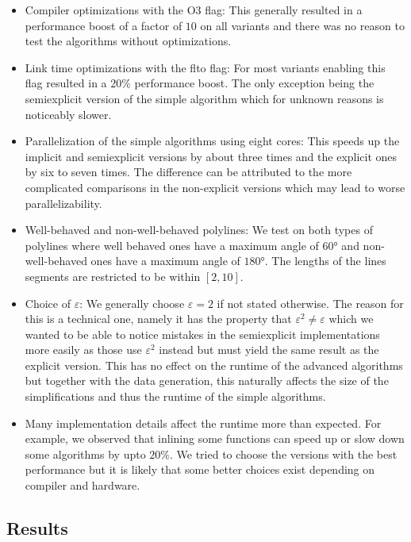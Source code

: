\begin{itemize}
  \item Compiler optimizations with the O3 flag: This generally resulted in a performance boost of a factor of \(10\) on all variants and there was no reason to test the algorithms without optimizations.
	\item Link time optimizations with the flto flag: For most variants enabling this flag resulted in a \(20\%\) performance boost. The only exception being the semiexplicit version of the simple algorithm which for unknown reasons is noticeably slower.
	\item Parallelization of the simple algorithms using eight cores: This speeds up the implicit and semiexplicit versions by about three times and the explicit ones by six to seven times. The difference can be attributed to the more complicated comparisons in the non-explicit versions which may lead to worse parallelizability. 
	\item Well-behaved and non-well-behaved polylines: We test on both types of polylines where well behaved ones have a maximum angle of \(60°\) and non-well-behaved ones have a maximum angle of \(180°\). The lengths of the lines segments are restricted to be within \([2, 10]\). 
	\item Choice of \(\varepsilon\): We generally choose \(\varepsilon = 2\) if not stated otherwise. The reason for this is a technical one, namely it has the property that \(\varepsilon^2 \neq \varepsilon\) which we wanted to be able to notice mistakes in the semiexplicit implementations more easily as those use \(\varepsilon^2\) instead but must yield the same result as the explicit version. This has no effect on the runtime of the advanced algorithms but together with the data generation, this naturally affects the size of the simplifications and thus the runtime of the simple algorithms.
	\item Many implementation details affect the runtime more than expected. For example, we observed that inlining some functions can speed up or slow down some algorithms by upto \(20\%\). We tried to choose the versions with the best performance but it is likely that some better choices exist depending on compiler and hardware. 
\end{itemize}

\subsection{Results}
\label{subsec:results}


